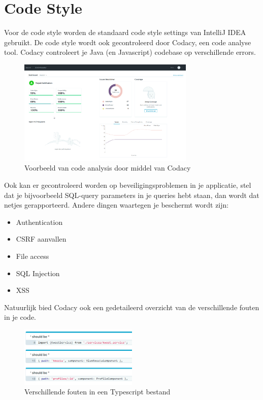 \chapter{Code Style}
Voor de code style worden de standaard code style settings van IntelliJ IDEA gebruikt.
De code style wordt ook gecontroleerd door Codacy, een code analyse tool.
Codacy controleert je Java (en Javascript) codebase op verschillende errors.

\begin{figure}[H]
	\includegraphics[width=0.75\textwidth]{images/StaticCodeAnalysis.png}
	\caption{Voorbeeld van code analysis door middel van Codacy}
	\label{fig:StaticCodeAnalyses}
\end{figure}

Ook kan er gecontroleerd worden op beveiligingsproblemen in je applicatie, stel dat je bijvoorbeeld SQL-query parameters in je queries hebt staan, dan wordt dat netjes gerapporteerd.
Andere dingen waartegen je beschermt wordt zijn:
\begin{itemize}
	\setlength\itemsep{0em}
	\item Authentication
	\item CSRF aanvallen
	\item File access
	\item SQL Injection
	\item XSS
\end{itemize}

Natuurlijk bied Codacy ook een gedetaileerd overzicht van de verschillende fouten in je code.
\begin{figure}[H]
	\centering\includegraphics[width=0.5\textwidth]{images/Codacy}
	\caption{Verschillende fouten in een Typescript bestand}
\end{figure}